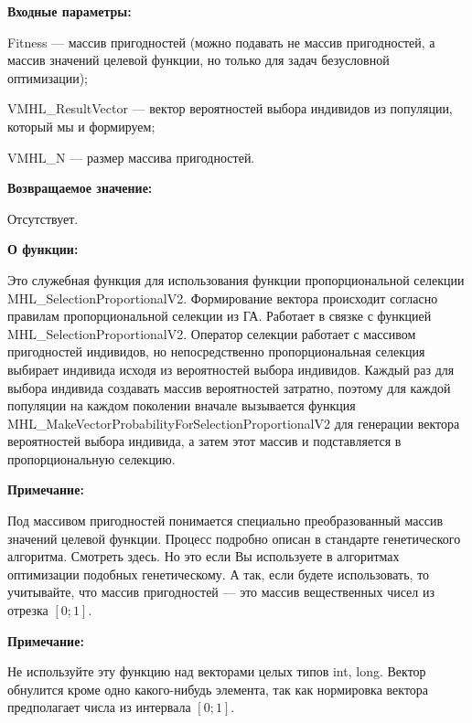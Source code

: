 \documentclass[a4paper,12pt]{article}
\begin{document}
\textbf{Входные параметры:}
 
Fitness --- массив пригодностей (можно подавать не массив пригодностей, а массив значений целевой функции, но только для задач безусловной оптимизации);
 
VMHL\_ResultVector --- вектор вероятностей выбора индивидов из популяции, который мы и формируем;
 
VMHL\_N --- размер массива пригодностей.

\textbf{Возвращаемое значение:} 

Отсутствует.

\textbf{О функции:}

 Это служебная функция для использования функции пропорциональной селекции MHL\_SelectionProportionalV2.
Формирование вектора происходит согласно правилам пропорциональной селекции из ГА.
Работает в связке с функцией MHL\_SelectionProportionalV2. Оператор селекции работает с массивом пригодностей индивидов, но непосредственно пропорциональная селекция выбирает индивида исходя из вероятностей выбора индивидов. Каждый раз для выбора индивида создавать массив вероятностей затратно, поэтому для каждой популяции на каждом поколении вначале вызывается функция MHL\_MakeVectorProbabilityForSelectionProportionalV2 для генерации вектора вероятностей выбора индивида, а затем этот массив и подставляется в пропорциональную селекцию.

\textbf{Примечание:}

 Под массивом пригодностей понимается специально преобразованный массив значений целевой функции. Процесс подробно описан в стандарте генетического алгоритма. Смотреть здесь. Но это если Вы используете в алгоритмах оптимизации подобных генетическому. А так, если будете использовать, то учитывайте, что массив пригодностей --- это массив вещественных чисел из отрезка $[0;1]$.
 
 \textbf{Примечание:} 

Не используйте эту функцию над векторами целых типов int, long. Вектор обнулится кроме одно какого-нибудь элемента, так как нормировка вектора предполагает числа из интервала $[0;1]$.
\end{document}
